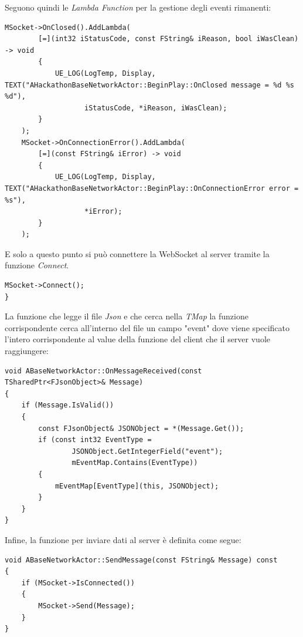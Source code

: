 Seguono quindi le \textit{Lambda Function} per la gestione degli eventi rimanenti:

\begin{lstlisting}[firstnumber=24, caption=Lambda function per la gestione della chiusura della connessione e dell'errore durante la connessione]
	MSocket->OnClosed().AddLambda(
		[=](int32 iStatusCode, const FString& iReason, bool iWasClean) -> void
		{
			UE_LOG(LogTemp, Display, TEXT("AHackathonBaseNetworkActor::BeginPlay::OnClosed message = %d %s %d"),
			       iStatusCode, *iReason, iWasClean);
		}
	);
	MSocket->OnConnectionError().AddLambda(
		[=](const FString& iError) -> void
		{
			UE_LOG(LogTemp, Display, TEXT("AHackathonBaseNetworkActor::BeginPlay::OnConnectionError error = %s"),
			       *iError);
		}
	);
\end{lstlisting}

E solo a questo punto si può connettere la WebSocket al server tramite la funzione \textit{Connect}. 
\begin{lstlisting}[firstnumber=38, caption = Connessione della WebSocket]
	MSocket->Connect();
}
\end{lstlisting}

La funzione che legge il file \textit{Json} e che cerca nella \textit{TMap} la funzione corrispondente cerca all'interno del file un campo "event" dove viene specificato l'intero corrispondente al value della funzione del client che il server vuole raggiungere:

\begin{lstlisting}[caption = funzione che gestisce la ricezione del messaggio in ABaseNetworkActor, label = {alg:OnMessageReceived}]
void ABaseNetworkActor::OnMessageReceived(const TSharedPtr<FJsonObject>& Message)
{
    if (Message.IsValid())
    {
        const FJsonObject& JSONObject = *(Message.Get());
        if (const int32 EventType = 
                JSONObject.GetIntegerField("event"); 
                mEventMap.Contains(EventType))
        {
            mEventMap[EventType](this, JSONObject);
        }
    }
}    
\end{lstlisting}

Infine, la funzione per inviare dati al server è definita come segue:

\begin{lstlisting}[caption = Funzione per inviare dati al server attraverso la WebSocket, label = {alg:SendMessage}]
void ABaseNetworkActor::SendMessage(const FString& Message) const
{
    if (MSocket->IsConnected())
    {
        MSocket->Send(Message);
    }
}
\end{lstlisting}

